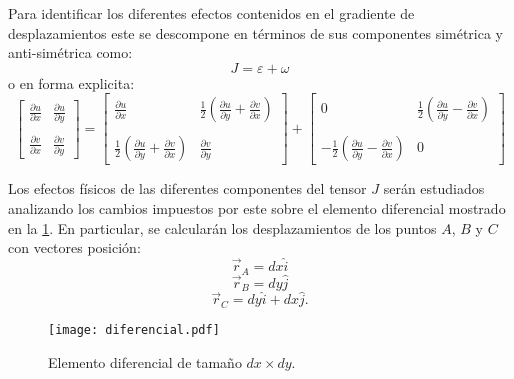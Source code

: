\documentclass[../notas medios.tex]{subfiles}
\begin{document}
Para identificar los diferentes efectos contenidos en el gradiente de desplazamientos este se descompone en términos de sus componentes simétrica y anti-simétrica como:
\[J = \varepsilon  + \omega \]
o en forma explicita:
\[\left[ {\begin{array}{*{20}{c}}
{\frac{{\partial u}}{{\partial x}}}&{\frac{{\partial u}}{{\partial y}}}\\\\
{\frac{{\partial v}}{{\partial x}}}&{\frac{{\partial v}}{{\partial y}}}
\end{array}} \right] = \left[ {\begin{array}{*{20}{c}}
{\frac{{\partial u}}{{\partial x}}}&{\frac{1}{2}\left( {\frac{{\partial u}}{{\partial y}} + \frac{{\partial v}}{{\partial x}}} \right)}\\\\
{\frac{1}{2}\left( {\frac{{\partial u}}{{\partial y}} + \frac{{\partial v}}{{\partial x}}} \right)}&{\frac{{\partial v}}{{\partial y}}}
\end{array}} \right] + \left[ {\begin{array}{*{20}{c}}
0&{\frac{1}{2}\left( {\frac{{\partial u}}{{\partial y}} - \frac{{\partial v}}{{\partial x}}} \right)}\\\\
{ - \frac{1}{2}\left( {\frac{{\partial u}}{{\partial y}} - \frac{{\partial v}}{{\partial x}}} \right)}&0
\end{array}} \right]\]


Los efectos físicos de las diferentes componentes del tensor $J$ serán estudiados analizando los cambios impuestos por este sobre el elemento diferencial mostrado en la \cref{diferencial}. En particular, se calcularán los desplazamientos de los puntos $A$, $B$ y $C$ con vectores posición:
\[{\vec r_A} = dx\hat i\]
\[{\vec r_B} = dy\hat j\]
\[{\vec r_C} = dy\hat i + dx\hat j. \]


\begin{figure}[H]
\centering
	\texttt{[image: diferencial.pdf]}
	\caption{Elemento diferencial de tamaño $dx \times dy$.}
	\label{diferencial}
\end{figure}
\end{document}
